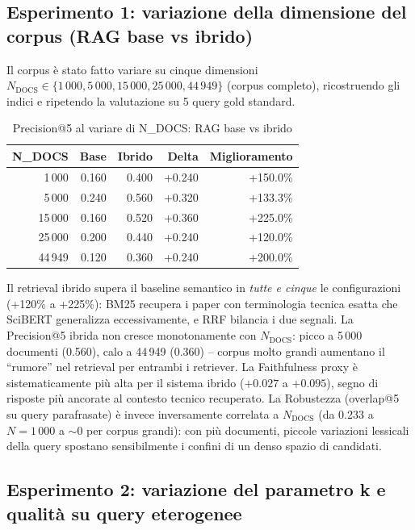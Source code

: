 \documentclass[12pt,a4paper]{article}
\begin{document}
\subsection{Esperimento 1: variazione della dimensione del corpus (RAG base vs ibrido)}

Il corpus \`e stato fatto variare su cinque dimensioni $N_{\text{DOCS}} \in \{1\,000, 5\,000, 15\,000, 25\,000, 44\,949\}$ (corpus completo), ricostruendo gli indici e ripetendo la valutazione su 5 query gold standard.

\begin{table}[H]
  \centering
  \caption{Precision@5 al variare di N\_DOCS: RAG base vs ibrido}
  \begin{tabular}{rrrrr}
    \toprule
    \textbf{N\_DOCS} & \textbf{Base} & \textbf{Ibrido} & \textbf{Delta} & \textbf{Miglioramento} \\
    \midrule
    1\,000  & 0.160 & 0.400 & +0.240 & +150.0\% \\
    5\,000  & 0.240 & 0.560 & +0.320 & +133.3\% \\
    15\,000 & 0.160 & 0.520 & +0.360 & +225.0\% \\
    25\,000 & 0.200 & 0.440 & +0.240 & +120.0\% \\
    44\,949 & 0.120 & 0.360 & +0.240 & +200.0\% \\
    \bottomrule
  \end{tabular}
\end{table}

Il retrieval ibrido supera il baseline semantico in \emph{tutte e cinque} le configurazioni (+120\% a +225\%): BM25 recupera i paper con terminologia tecnica esatta che SciBERT generalizza eccessivamente, e RRF bilancia i due segnali. La Precision@5 ibrida non cresce monotonamente con $N_{\text{DOCS}}$: picco a 5\,000 documenti (0.560), calo a 44\,949 (0.360) -- corpus molto grandi aumentano il ``rumore'' nel retrieval per entrambi i retriever. La Faithfulness proxy \`e sistematicamente pi\`u alta per il sistema ibrido ($+0.027$ a $+0.095$), segno di risposte pi\`u ancorate al contesto tecnico recuperato. La Robustezza (overlap@5 su query parafrasate) \`e invece inversamente correlata a $N_{\text{DOCS}}$ (da 0.233 a $N=1\,000$ a $\sim$0 per corpus grandi): con pi\`u documenti, piccole variazioni lessicali della query spostano sensibilmente i confini di un denso spazio di candidati.

\subsection{Esperimento 2: variazione del parametro k e qualit\`a su query eterogenee}
\end{document}
